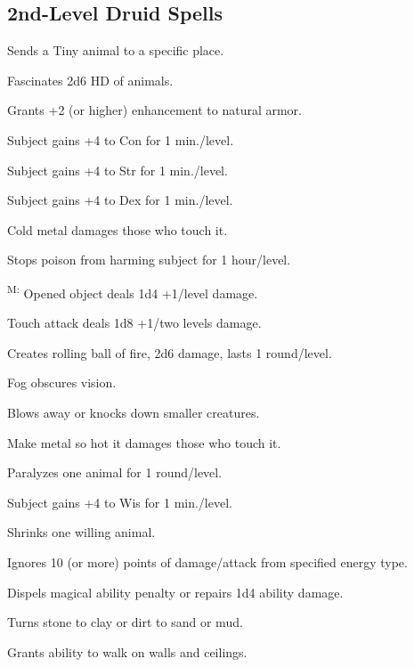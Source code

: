 \subsection{2nd-Level Druid Spells}

 Sends a Tiny animal to a specific place.

 Fascinates 2d6 HD of animals.

 Grants +2 (or higher) enhancement to natural armor.

 Subject gains +4 to Con for 1 min./level.

 Subject gains +4 to Str for 1 min./level.

 Subject gains +4 to Dex for 1 min./level.

 Cold metal damages those who touch it.

 Stops poison from harming subject for 1 hour/level.

\textsuperscript{M:} Opened object deals 1d4 +1/level damage.

 Touch attack deals 1d8 +1/two levels damage.

 Creates rolling ball of fire, 2d6 damage, lasts 1 round/level.

 Fog obscures vision.

 Blows away or knocks down smaller creatures.

 Make metal so hot it damages those who touch it.

 Paralyzes one animal for 1 round/level.

 Subject gains +4 to Wis for 1 min./level.

 Shrinks one willing animal.

 Ignores 10 (or more) points of damage/attack from specified energy type.

 Dispels magical ability penalty or repairs 1d4 ability damage.

 Turns stone to clay or dirt to sand or mud.

 Grants ability to walk on walls and ceilings.


